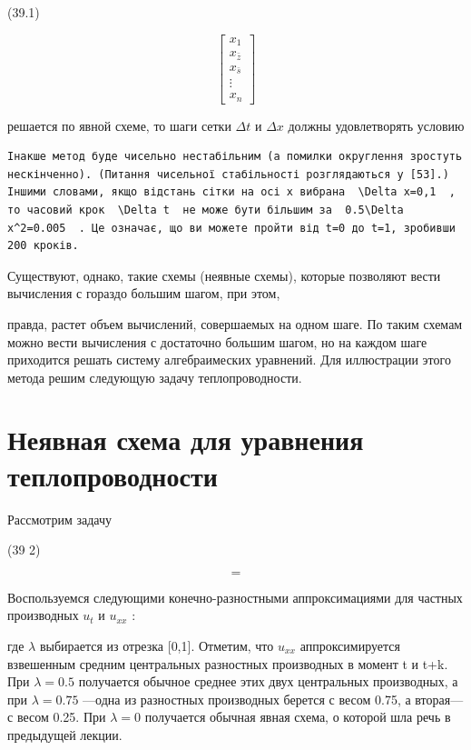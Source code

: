 \documentclass[
  ukrainian,
]{article}
\begin{document}
(39.1)

\[
\begin{bmatrix} x_1 \\ x_{\bar{z}} \\ x_{\bar{s}} \\ \vdots \\ x_n \end{bmatrix}
\]

решается по явной схеме, то шаги сетки \(\Delta t\) и \(\Delta x\)
должны удовлетворять условию

\begin{verbatim}
Інакше метод буде чисельно нестабільним (а помилки округлення зростуть нескінченно). (Питання чисельної стабільності розглядаються у [53].) Іншими словами, якщо відстань сітки на осі x вибрана  \Delta x=0,1  , то часовий крок  \Delta t  не може бути більшим за  0.5\Delta x^2=0.005  . Це означає, що ви можете пройти від t=0 до t=1, зробивши 200 кроків.
\end{verbatim}

Существуют, однако, такие схемы (неявные схемы), которые позволяют вести
вычисления с гораздо большим шагом, при этом,

правда, растет объем вычислений, совершаемых на одном шаге. По таким
схемам можно вести вычисления с достаточно большим шагом, но на каждом
шаге приходится решать систему алгебраимеских уравнений. Для иллюстрации
этого метода решим следующую задачу теплопроводности.

\section{Неявная схема для уравнения
теплопроводности}\label{ux43dux435ux44fux432ux43dux430ux44f-ux441ux445ux435ux43cux430-ux434ux43bux44f-ux443ux440ux430ux432ux43dux435ux43dux438ux44f-ux442ux435ux43fux43bux43eux43fux440ux43eux432ux43eux434ux43dux43eux441ux442ux438}

Рассмотрим задачу

(39 2)

\[
=
\]

Воспользуемся следующими конечно-разностными аппроксимациями для частных
производных \(u_t\) и \(u_{xx}\) :

где \(\lambda\) выбирается из отрезка {[}0,1{]}. Отметим, что \(u_{xx}\)
аппроксимируется взвешенным средним центральных разностных производных в
момент t и t+k. При \(\lambda=0.5\) получается обычное среднее этих двух
центральных производных, а при \(\lambda=0.75\) ---одна из разностных
производных берется с весом 0.75, а вторая---с весом 0.25. При
\(\lambda=0\) получается обычная явная схема, о которой шла речь в
предыдущей лекции.
\end{document}
